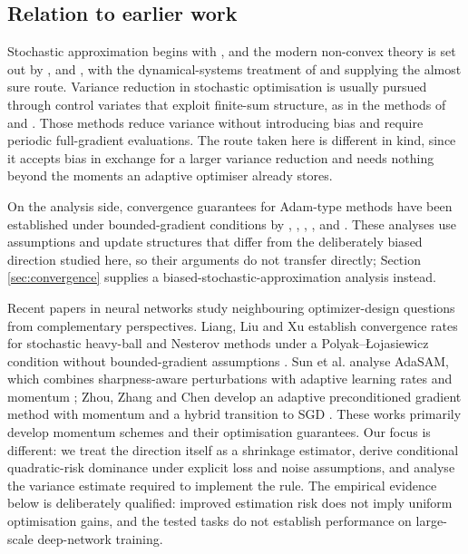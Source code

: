\documentclass[a4paper,fleqn]{cas-dc}
\theoremstyle{plain}
\theoremstyle{definition}
\theoremstyle{remark}
\begin{document}
\subsection{Relation to earlier work}

Stochastic approximation begins with \citet{robbins1951}, and the modern non-convex theory is set out by \citet{nemirovski2009}, \citet{ghadimi2013} and \citet{bottou2018}, with the dynamical-systems treatment of \citet{borkar2008} and \citet{kushner2003} supplying the almost sure route. Variance reduction in stochastic optimisation is usually pursued through control variates that exploit finite-sum structure, as in the methods of \citet{johnson2013} and \citet{defazio2014}. Those methods reduce variance without introducing bias and require periodic full-gradient evaluations. The route taken here is different in kind, since it accepts bias in exchange for a larger variance reduction and needs nothing beyond the moments an adaptive optimiser already stores.

On the analysis side, convergence guarantees for Adam-type methods have been established under bounded-gradient conditions by \citet{reddi2018}, \citet*{chen2019}, \citet{zaheer2018}, \citet{barakat2021}, and \citet{defossez2022}. These analyses use assumptions and update structures that differ from the deliberately biased direction studied here, so their arguments do not transfer directly; Section \ref{sec:convergence} supplies a biased-stochastic-approximation analysis instead.

Recent papers in neural networks study neighbouring optimizer-design questions from complementary perspectives. Liang, Liu and Xu establish convergence rates for stochastic heavy-ball and Nesterov methods under a Polyak--Łojasiewicz condition without bounded-gradient assumptions \citep{liang2023momentum}. Sun et al. analyse AdaSAM, which combines sharpness-aware perturbations with adaptive learning rates and momentum \citep{sun2024adasam}; Zhou, Zhang and Chen develop an adaptive preconditioned gradient method with momentum and a hybrid transition to SGD \citep{zhou2026adapgradm}. These works primarily develop momentum schemes and their optimisation guarantees. Our focus is different: we treat the direction itself as a shrinkage estimator, derive conditional quadratic-risk dominance under explicit loss and noise assumptions, and analyse the variance estimate required to implement the rule. The empirical evidence below is deliberately qualified: improved estimation risk does not imply uniform optimisation gains, and the tested tasks do not establish performance on large-scale deep-network training.
\end{document}
